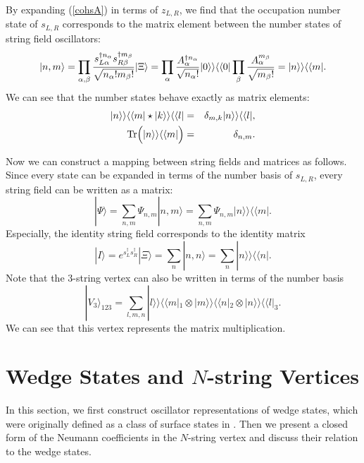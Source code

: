 \documentclass[a4paper,12pt]{article}
\def\cob{\delta}
\def\Tr{{\rm Tr}}
\def\o{\over}
\def\ket{\rangle}
\def\bt{\beta}
\def\al{\alpha}
\def\tens{\otimes}
\def\dag{\dagger}
\def\rt#1{\sqrt{#1}}
\def\st{\star}
\def\sd{s^{\dagger}}
\newcommand{\kket}{\rangle\rangle}
\newcommand{\bbra}{\langle\langle}
\begin{document}
By expanding (\ref{cohsA}) in terms of $z_{L,R}$,
we find that the occupation number state of 
$s_{L,R}$ corresponds to the matrix element between the number states
of string field oscillators:
\begin{equation}
 |n,m\ket=\prod_{\al,\bt}{s_{L\al}^{\dag n_{\al}}s_{R\bt}^{\dag m_{\bt}}\o
\rt{n_{\al}!m_{\bt}!}}|\Xi\ket = \prod_{\al}{A_{\al}^{\dag n_{\al}}
\o\rt{n_{\al}!}}|0\kket\bbra 0|\prod_{\bt}{A_{\al}^{m_{\bt}}
\o\rt{m_{\bt}!}}=|n\kket\bbra m|.
\end{equation}
We can see that the number states behave exactly as matrix elements:
\begin{eqnarray}
 |n\kket\bbra m|\st|k\kket\bbra l|&=&\cob_{m,k}|n\kket\bbra l|, \\
 \Tr\Big(|n\kket\bbra m|\Big)&=&\cob_{n,m}.
\end{eqnarray}

Now we can construct a mapping between string fields and matrices
as follows.
Since every state can be expanded in terms of the number basis of
$s_{L,R}$,  every string field can be written as a matrix:
\begin{equation}
 |\Psi\ket=\sum_{n,m}\Psi_{n,m}|n,m\ket=\sum_{n,m}\Psi_{n,m}|n\kket\bbra m|.
\end{equation}
Especially, the identity string field corresponds to the identity matrix
\begin{equation}
 |I\ket=e^{\sd_L\sd_R}|\Xi\ket=\sum_n|n,n\ket=\sum_n|n\kket\bbra n|.
\end{equation}
Note that the 3-string vertex can also be written in terms of the number basis
\begin{equation}
 |V_3\ket_{123}=\sum_{l,m,n}|l\kket\bbra m|_1\tens |m\kket\bbra n|_2\tens
|n\kket\bbra l|_3.
\end{equation}
We can see that this vertex represents the matrix multiplication. 




\section{Wedge States and $N$-string Vertices}
In this section, we first construct oscillator 
representations of wedge states, which were originally
defined as a class of surface states in \cite{RZ}. 
Then we present a closed form of
the Neumann coefficients in the $N$-string vertex and 
discuss their relation to the wedge states.  
\end{document}

